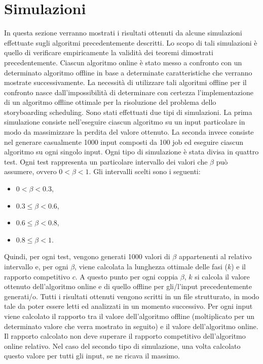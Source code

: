 \documentclass[12pt]{article}
\begin{document}
\section{Simulazioni}
In questa sezione verranno mostrati i risultati ottenuti da alcune simulazioni effettuate sugli algoritmi precedentemente descritti. Lo scopo di tali simulazioni è quello di verificare empiricamente la validità dei teoremi dimostrati precedentemente. Ciascun algoritmo online è stato messo a confronto con un determinato algoritmo offline in base a determinate caratteristiche che verranno mostrate successivamente. La necessità di utilizzare tali algoritmi offline per il confronto nasce dall’impossibilità di determinare con certezza l’implementazione di un algoritmo offline ottimale per la risoluzione del problema dello storyboarding scheduling. Sono stati effettuati due tipi di simulazioni. La prima simulazione consiste nell'eseguire ciascun algoritmo su un input particolare in modo da massimizzare la perdita del valore ottenuto. La seconda invece consiste nel generare casualmente 1000 input composti da 100 job ed eseguire ciascun algoritmo su ogni singolo input. Ogni tipo di simulazione è stata divisa in quattro test. Ogni test rappresenta un particolare intervallo dei valori che $\beta$ può assumere, ovvero $0 < \beta < 1$. Gli intervalli scelti sono i seguenti:
\begin{itemize}
\item{$0 < \beta < 0.3$,}
\item{$0.3 \leq \beta < 0.6$,}
\item{$0.6 \leq \beta < 0.8$,}
\item{$0.8 \leq \beta < 1$.}
\end{itemize}
Quindi, per ogni test, vengono generati 1000 valori di $\beta$ appartenenti al relativo intervallo e, per ogni $\beta$, viene calcolata la lunghezza ottimale delle fasi ($k$) e il rapporto competitivo $c$. A questo punto per ogni coppia $\beta$, $k$ si calcola il valore ottenuto dell'algoritmo online e di quello offline per gli/l'input precedentemente generati/o. Tutti i risultati ottenuti vengono scritti in un file strutturato, in modo tale da poter essere letti ed analizzati in un momento successivo. Per ogni input viene calcolato il rapporto tra il valore dell'algoritmo offline (moltiplicato per un determinato valore che verra mostrato in seguito) e il valore dell'algoritmo online. Il rapporto calcolato non deve superare il rapporto competitivo dell'algoritmo online relativo. Nel caso del secondo tipo di simulazione, una volta calcolato questo valore per tutti gli input, se ne ricava il massimo. 
\end{document}
